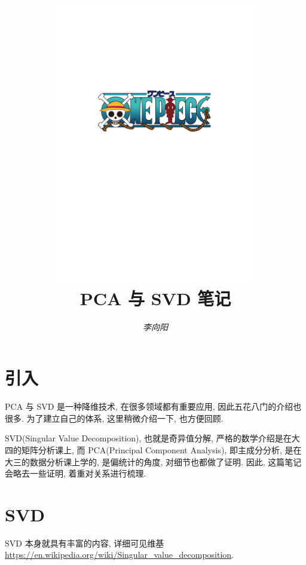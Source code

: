 \documentclass[a4paper,UTF8]{ctexart}
\theoremstyle{plain} \newtheorem{theorem}{定理}[section]
\theoremstyle{plain} \newtheorem{definition}{定义}[section]
\theoremstyle{plain} \newtheorem{lemma}{引理}[section]
\theoremstyle{plain} \newtheorem{proposition}{命题}[section]
\theoremstyle{plain} \newtheorem{example}{例}[section]
\theoremstyle{plain} \newtheorem{remark}{注}[section]
\theoremstyle{plain} \newtheorem{corollary}{推论}[section]
\begin{document}
\title{
\includegraphics[width=0.65\textwidth]{onepiece.pdf}\\
\vspace{2em}
\textbf{PCA 与 SVD 笔记}}
\author{\emph{李向阳}  }
\date{}


\maketitle
\thispagestyle{empty}

\newpage


\tableofcontents

\newpage

\section{引入}
PCA 与 SVD 是一种降维技术, 在很多领域都有重要应用, 因此五花八门的介绍也很多. 为了建立自己的体系, 这里稍微介绍一下, 也方便回顾.

SVD(Singular Value Decomposition), 也就是奇异值分解, 严格的数学介绍是在大四的矩阵分析课上, 而 PCA(Principal Component Analysis), 即主成分分析, 是在大三的数据分析课上学的, 是偏统计的角度, 对细节也都做了证明. 因此, 这篇笔记会略去一些证明, 着重对关系进行梳理.


\section{SVD}
SVD 本身就具有丰富的内容, 详细可见维基 \url{https://en.wikipedia.org/wiki/Singular_value_decomposition}.
\end{document}
